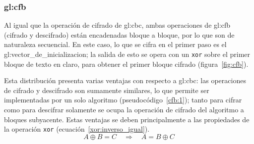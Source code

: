 %
%

\subsubsection{\texorpdfstring{\acrfull{gl:cfb}}{Cipher Feedback (CFB)}}

Al igual que la operación de cifrado de \gls{gl:cbc}, ambas operaciones
de \gls{gl:cfb} (cifrado y descifrado) están encadenadas bloque a bloque,
por lo que son de naturaleza secuencial. En este caso, lo que se cifra en el
primer paso es el \gls{gl:vector_de_inicializacion}; la salida de esto se opera
con un \verb|xor| sobre el primer bloque de texto en claro, para obtener el
primer bloque cifrado (figura~\ref{fig:cfb}).

Esta distribución presenta varias ventajas con respecto a \gls{gl:cbc}:
las operaciones de cifrado y descifrado son sumamente similares, lo que permite
ser implementadas por un solo algoritmo (pseudocódigo~\ref{cfb:1}); tanto para
cifrar como para descifrar solamente se ocupa la operación de cifrado del
algoritmo a bloques subyacente. Estas ventajas se deben principalmente a las
propiedades de la operación \verb|xor| (ecuación~\ref{xor:inverso_igual}).
\begin{equation}
  \label{xor:inverso_igual}
  A \oplus B = C \quad \Rightarrow \quad A = B \oplus C
\end{equation}

